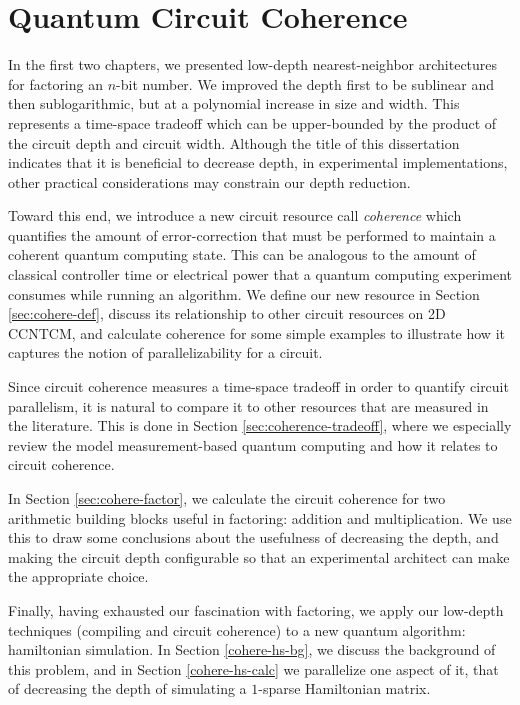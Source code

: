 \chapter{Quantum Circuit Coherence}
\label{chap:coherence}

In the first two chapters, we presented low-depth nearest-neighbor
architectures for factoring an $n$-bit number. We improved the depth first to
be sublinear and then sublogarithmic, but at a polynomial increase in size
and width. This represents a time-space tradeoff which can be upper-bounded
by the product of the circuit depth and circuit width. Although the title of
this dissertation indicates that it is beneficial to decrease depth, in
experimental implementations, other practical considerations may constrain
our depth reduction.

Toward this end, we introduce a new circuit resource call \emph{coherence}
which quantifies the amount of error-correction that must be performed
to maintain a coherent quantum computing state. This can be analogous to
the amount of classical controller time or electrical power that a
quantum computing experiment consumes while running an algorithm. We
define our new resource in Section \ref{sec:cohere-def}, discuss its
relationship to other circuit resources on \textsf{2D CCNTCM}, and
calculate coherence for some simple examples to illustrate how it
captures the notion of parallelizability for a circuit.

Since circuit coherence measures a time-space tradeoff in order to
quantify circuit parallelism, it is natural to
compare it to other resources that are measured in the literature.
This is done in Section \ref{sec:coherence-tradeoff}, where we
especially review the model measurement-based quantum computing and
how it relates to circuit coherence.

In Section \ref{sec:cohere-factor}, we calculate the circuit coherence
for two arithmetic building blocks useful in factoring: addition
and multiplication. We use this to draw some conclusions about the
usefulness of decreasing the depth, and making the circuit depth configurable
so that an experimental architect can make the appropriate choice.

Finally, having exhausted our fascination with factoring,
we apply our low-depth techniques (compiling and circuit coherence)
to a new quantum algorithm: hamiltonian
simulation. In Section \ref{cohere-hs-bg}, we discuss the background of
this problem, and in Section \ref{cohere-hs-calc} we parallelize one
aspect of it, that of decreasing the depth of simulating
a $1$-sparse Hamiltonian matrix.










